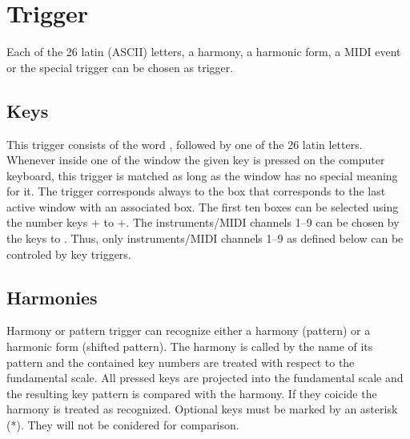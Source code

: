 



\section{Trigger}\label{sec:ausloser}

Each of the 26 latin (ASCII) letters, a
harmony, a harmonic form, a MIDI event or the special trigger
 can be chosen as trigger.



\subsection{Keys}\label{sec:tasten}

This trigger consists of the word ,
followed by one of the 26 latin letters. Whenever inside one of the
\mutabor{} window the
given key is pressed on the computer keyboard, this trigger is matched
as long as the window has no special meaning for it. The trigger
corresponds always to the \mutabor{} box that corresponds to the last
active window with an associated box. The first ten boxes can be 
selected using the number keys
\Ctrl+ to \Ctrl+. The instruments/MIDI
channels 1–9 can be chosen by the keys  to . Thus, only instruments/MIDI channels 1–9 as defined below can be
controled by key triggers.
\iffalse
Dieser Auslöser\index{Auslöser!Taste}
 besteht aus dem Wort {\it Taste}\index{Tasten}, gefolgt von einem der
26 Buchstaben. Wenn innerhalb von \mutabor{} die angegebene Taste auf der
Tastatur gedrückt wird, so gilt dieser Auslöser als erfüllt.
Der Auslöser bezieht sich jeweils auf das Instrument bzw.\ MIDI-Kanal,
das vorher
mit den Zifferntasten angewählt wurde. Man kann also nur die
Instrumente/MIDI-Kanäle 1--9 mit einem Tasten-Auslöser steuern.
\fi



\subsection{Harmonies}\label{sec:harmonien}
Harmony or pattern trigger can recognize either a
harmony (pattern) or a harmonic form (shifted
pattern). The harmony is called by the
name of its pattern and the contained key numbers are treated with
respect to the fundamental scale. All pressed
keys are projected into the fundamental scale and the resulting
key pattern is compared with the harmony. If they coicide the harmony
is treated as recognized. Optional keys must be marked by an asterisk
(*). They will not be conidered for comparison.

